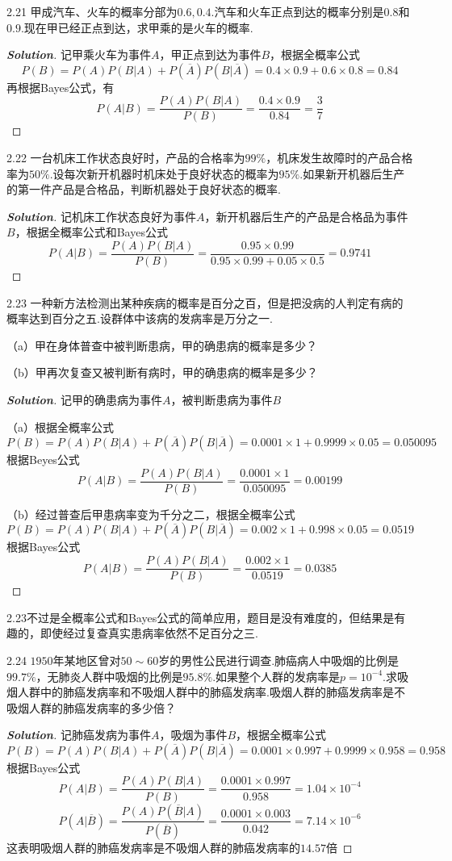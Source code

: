 \documentclass[10pt, a4paper, oneside]{ctexart}
\newenvironment{solution}{\begin{proof}[\bf Solution]}{\end{proof}}
\begin{document}
2.21 甲成汽车、火车的概率分部为$0.6,0.4$.汽车和火车正点到达的概率分别是$0.8$和$0.9$.现在甲已经正点到达，求甲乘的是火车的概率.
\begin{solution}
记甲乘火车为事件$A$，甲正点到达为事件$B$，根据全概率公式
\[P(B) = P(A)P(B|A) + P(\overline A )P(B|\overline A ) = 0.4 \times 0.9 + 0.6 \times 0.8 = 0.84\]
再根据Bayes公式，有
\[P(A|B) = \frac{{P(A)P(B|A)}}{{P(B)}} = \frac{{0.4 \times 0.9}}{{0.84}} = \frac{3}{7}\]
\end{solution}


2.22 一台机床工作状态良好时，产品的合格率为$99\%$，机床发生故障时的产品合格率为$50\%$.设每次新开机器时机床处于良好状态的概率为$95\%$.如果新开机器后生产的第一件产品是合格品，判断机器处于良好状态的概率.
\begin{solution}
记机床工作状态良好为事件$A$，新开机器后生产的产品是合格品为事件$B$，根据全概率公式和Bayes公式
\[P(A|B) = \frac{{P(A)P(B|A)}}{{P(B)}} = \frac{{0.95 \times 0.99}}{{0.95 \times 0.99 + 0.05 \times 0.5}} = 0.9741\]
\end{solution}

2.23 一种新方法检测出某种疾病的概率是百分之百，但是把没病的人判定有病的概率达到百分之五.设群体中该病的发病率是万分之一.

（a）甲在身体普查中被判断患病，甲的确患病的概率是多少？

（b）甲再次复查又被判断有病时，甲的确患病的概率是多少？
\begin{solution}
记甲的确患病为事件$A$，被判断患病为事件$B$

（a）根据全概率公式
\[P(B) = P(A)P(B|A) + P(\overline A )P(B|\overline A ) = 0.0001 \times 1 + 0.9999 \times 0.05 = 0.050095\]
根据Beyes公式
\[P(A|B) = \frac{{P(A)P(B|A)}}{{P(B)}} = \frac{{0.0001 \times 1}}{{0.050095}} = 0.00199\]

（b）经过普查后甲患病率变为千分之二，根据全概率公式
\[P(B) = P(A)P(B|A) + P(\overline A )P(B|\overline A ) = 0.002 \times 1 + 0.998 \times 0.05 = 0.0519\]
根据Bayes公式
\[P(A|B) = \frac{{P(A)P(B|A)}}{{P(B)}} = \frac{{0.002 \times 1}}{{0.0519}} = 0.0385\]
\end{solution}
\begin{remark}
2.23不过是全概率公式和Bayes公式的简单应用，题目是没有难度的，但结果是有趣的，即使经过复查真实患病率依然不足百分之三.
\end{remark}

2.24 $1950$年某地区曾对$50\sim 60$岁的男性公民进行调查.肺癌病人中吸烟的比例是$99.7\%$，无肺炎人群中吸烟的比例是$95.8\%$.如果整个人群的发病率是$p=10^{-4}$.求吸烟人群中的肺癌发病率和不吸烟人群中的肺癌发病率.吸烟人群的肺癌发病率是不吸烟人群的肺癌发病率的多少倍？
\begin{solution}
记肺癌发病为事件$A$，吸烟为事件$B$，根据全概率公式
\[P(B) = P(A)P(B|A) + P(\overline A )P(B|\overline A ) = 0.0001 \times 0.997 + 0.9999 \times 0.958 = 0.958\]
根据Bayes公式
\[P(A|B) = \frac{{P(A)P(B|A)}}{{P(B)}} = \frac{{0.0001 \times 0.997}}{{0.958}} = 1.04 \times {10^{ - 4}}\]
\[P(A|\overline B ) = \frac{{P(A)P(\overline B |A)}}{{P(\overline B )}} = \frac{{0.0001 \times 0.003}}{{0.042}} = 7.14 \times {10^{ - 6}}\]
这表明吸烟人群的肺癌发病率是不吸烟人群的肺癌发病率的$14.57$倍
\end{solution}
\end{document}
